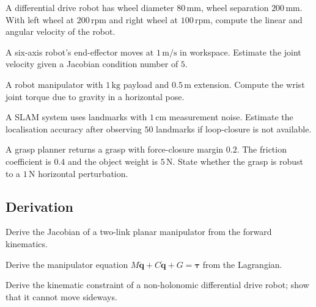 \begin{exercise}
A differential drive robot has wheel diameter $80\,\text{mm}$, wheel separation $200\,\text{mm}$. With left wheel at $200\,\text{rpm}$ and right wheel at $100\,\text{rpm}$, compute the linear and angular velocity of the robot.
\end{exercise}

\begin{exercise}
A six-axis robot's end-effector moves at $1\,\text{m/s}$ in workspace. Estimate the joint velocity given a Jacobian condition number of $5$.
\end{exercise}

\begin{exercise}
A robot manipulator with $1\,\text{kg}$ payload and $0.5\,\text{m}$ extension. Compute the wrist joint torque due to gravity in a horizontal pose.
\end{exercise}

\begin{exercise}
A SLAM system uses landmarks with $1\,\text{cm}$ measurement noise. Estimate the localisation accuracy after observing $50$ landmarks if loop-closure is not available.
\end{exercise}

\begin{exercise}
A grasp planner returns a grasp with force-closure margin $0.2$. The friction coefficient is $0.4$ and the object weight is $5\,\text{N}$. State whether the grasp is robust to a $1\,\text{N}$ horizontal perturbation.
\end{exercise}

\subsection*{Derivation}

\begin{exercise}
Derive the Jacobian of a two-link planar manipulator from the forward kinematics.
\end{exercise}

\begin{exercise}
Derive the manipulator equation $M\ddot{\mathbf{q}} + C\dot{\mathbf{q}} + G = \boldsymbol{\tau}$ from the Lagrangian.
\end{exercise}

\begin{exercise}
Derive the kinematic constraint of a non-holonomic differential drive robot; show that it cannot move sideways.
\end{exercise}

